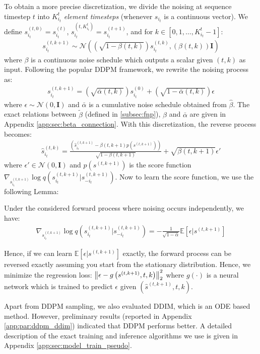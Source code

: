 To obtain a more precise discretization, we divide the noising at sequence timestep $t$ into $K_{i_t}^t$ \textit{element timesteps} (whenever $s_{i_t}$ is a continuous vector). We define $s_{i_t}^{(t, 0)} = s_{i_t}^{(t)}$, $s_{i_t}^{(t, K_{i_t}^{t})} = s_{i_t}^{(t+1)}$, and for $k \in [0, 1, \dots, K_{i_t}^{t}-1]$:
\small
\begin{align*}
    s^{(t, k+1)}_{i_t} \sim \mathcal{N}\left(\left(\sqrt{1 - {\beta}(t, k)}\right) s^{(t, k)}_{i_t}, \left({{\beta}(t, k)}\right) \mathbf{I}  \right)
\end{align*}
\normalsize
where ${\beta}$ is a continuous noise schedule which outputs a scalar given $(t, k)$ as input. Following the popular DDPM \cite{ho2020denoising} framework, we rewrite the noising process as:
\small
\begin{align}\label{eq:diff_relation}
    s^{(t, k+1)}_{i_t} = \left(\sqrt{\bar{\alpha}(t, k)}\right) s^{(0)}_{i_t} + \left(\sqrt{1 - \bar{\alpha}(t, k)}\right) \epsilon
\end{align}
\normalsize
where $\epsilon \sim \mathcal{N}(0, \mathbf{I})$ and $\bar{\alpha}$ is a cumulative noise schedule obtained from $\hat{\beta}$. The exact relations between $\tilde{\beta}$ (defined in \ref{subsec:fnp}), ${\beta}$ and $\bar{\alpha}$ are given in Appendix \ref{app:sec:beta_connection}. With this discretization, the reverse process becomes:
\small
\begin{align*}
    \hat{s}^{(t, k)}_{i_t} = \frac{\left(\hat{s}^{(t, k+1)}_{i_t} - {\beta}(t, k+1)p({s}^{(t, k+1)}) \right)}{\sqrt{1 - {\beta}(t, k+1)}} 
    + \sqrt{{\beta}(t, k+1)} \epsilon'
\end{align*}
\normalsize
where $\epsilon' \in \mathcal{N}(0, \mathbf{I})$ and  $p({s}^{(t, k+1)})$ is the  score function $\nabla_{{s}_{i_t}^{(t, k+1)}} \log q({s}_{i_t}^{(t, k+1)} | {s}_{-i_t}^{(t, k+1)} )$. Now to learn the score function, we use the following Lemma:
\begin{lemma}
Under the considered forward process where noising occurs independently, we have:
 \begin{align*}
     \nabla_{{s}_{i_t}^{(t, k+1)}} \log q({s}_{i_t}^{(t, k+1)} | {s}_{-i_t}^{(t, k+1)} )  = -\frac{1}{\sqrt{1-\bar{\alpha}}} \mathbb{E} \left[ \epsilon | {s}^{(t,k+1)} \right]
 \end{align*}
\label{lemma:score_noise}
\end{lemma}
Hence, if we can learn $\mathbb{E} \left[ \epsilon | {s}^{(t,k+1)} \right]$ exactly, the forward process can be reversed exactly assuming you start from the stationary distribution. Hence, we minimize the regression loss: $\norm{\epsilon - g\left({s}^{(t, k+1)}, t, k \right)}_2^2$
where $g(\cdot)$ is a neural network which is trained to predict  $\epsilon $ given $\left(\hat{s}^{(t, k+1)}, t, k \right)$. 

Apart from DDPM sampling, we also evaluated DDIM, which is an ODE based method. However, preliminary results (reported in Appendix \ref{app:par:ddpm_ddim}) indicated that DDPM performs better. A detailed description of the exact training and inference algorithms we use is given in Appendix \ref{app:sec:model_train_pseudo}.
